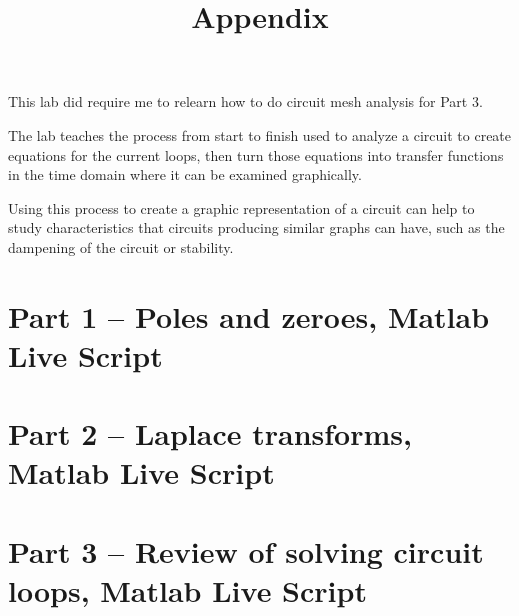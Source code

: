 \documentclass[12pt]{article}
\begin{document}
This lab did require me to relearn how to do circuit mesh analysis for Part 3.

The lab teaches the process from start to finish used to analyze a circuit to create equations for the current loops, then turn those equations into transfer functions in the time domain where it can be examined graphically.

Using this process to create a graphic representation of a circuit can help to study characteristics that circuits producing similar graphs can have, such as the dampening of the circuit or stability.


\newpage
\appendix
\title{Appendix}\label{doc:apx}
\maketitle

\section{Part 1 -- Poles and zeroes, Matlab Live Script}



\section{Part 2 -- Laplace transforms, Matlab Live Script}



\section{Part 3 -- Review of solving circuit loops, Matlab Live Script}\label{apx:solving circuit loops}


\end{document}
